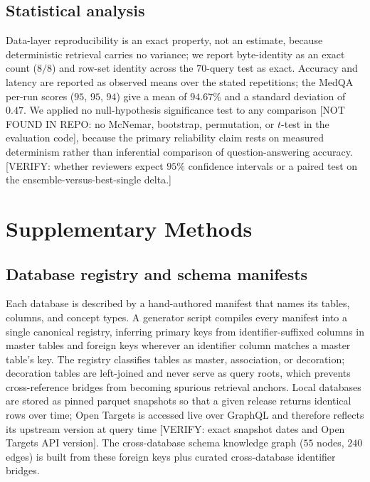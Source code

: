 \subsection*{Statistical analysis}

Data-layer reproducibility is an exact property, not an estimate, because deterministic retrieval carries no variance; we report byte-identity as an exact count ($8/8$) and row-set identity across the $70$-query test as exact. Accuracy and latency are reported as observed means over the stated repetitions; the MedQA per-run scores ($95$, $95$, $94$) give a mean of $94.67\%$ and a standard deviation of $0.47$. We applied no null-hypothesis significance test to any comparison [NOT FOUND IN REPO: no McNemar, bootstrap, permutation, or $t$-test in the evaluation code], because the primary reliability claim rests on measured determinism rather than inferential comparison of question-answering accuracy. [VERIFY: whether reviewers expect $95\%$ confidence intervals or a paired test on the ensemble-versus-best-single delta.]



\section*{Supplementary Methods}

\subsection*{Database registry and schema manifests}

Each database is described by a hand-authored manifest that names its tables, columns, and concept types. A generator script compiles every manifest into a single canonical registry, inferring primary keys from identifier-suffixed columns in master tables and foreign keys wherever an identifier column matches a master table's key. The registry classifies tables as master, association, or decoration; decoration tables are left-joined and never serve as query roots, which prevents cross-reference bridges from becoming spurious retrieval anchors. Local databases are stored as pinned parquet snapshots so that a given release returns identical rows over time; Open Targets is accessed live over GraphQL and therefore reflects its upstream version at query time [VERIFY: exact snapshot dates and Open Targets API version]. The cross-database schema knowledge graph ($55$ nodes, $240$ edges) is built from these foreign keys plus curated cross-database identifier bridges.

